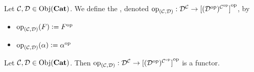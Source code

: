 \documentclass{book}
\begin{document}
	\begin{defn}
		Let $\MC, \MD \in \Obj(\bCat)$. We define the , denoted $\opp_{(\MC, \MD)}: \MD^{\MC} \rightarrow \op{[(\op{\MD})^{{\op{\MC}}}]}$, by 
		\begin{itemize}
			\item $\opp_{(\MC, \MD)}(F) \defeq \op{F}$
			\item $\opp_{(\MC, \MD)}(\al) \defeq \op{\al}$
		\end{itemize}
	\end{defn}
	
	\begin{ex}
		Let $\MC, \MD \in \Obj(\bCat)$. Then $\opp_{(\MC, \MD)}: \MD^{\MC} \rightarrow \op{[(\op{\MD})^{{\op{\MC}}}]}$ is a functor.
	\end{ex}
	
\end{document}
